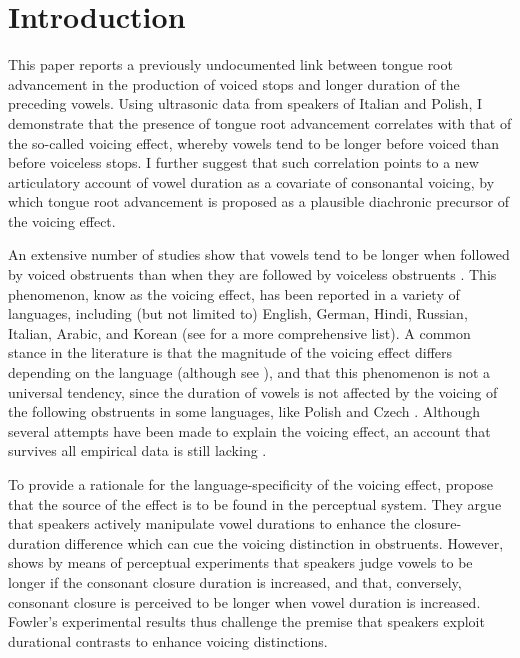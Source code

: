 \documentclass[authoryear, 5p]{elsarticle}
\begin{document}
\section{Introduction}\label{introduction}

\label{s:intro}

This paper reports a previously undocumented link between tongue root
advancement in the production of voiced stops and longer duration of the
preceding vowels. Using ultrasonic data from speakers of Italian and
Polish, I demonstrate that the presence of tongue root advancement
correlates with that of the so-called voicing effect, whereby vowels
tend to be longer before voiced than before voiceless stops. I further
suggest that such correlation points to a new articulatory account of
vowel duration as a covariate of consonantal voicing, by which tongue
root advancement is proposed as a plausible diachronic precursor of the
voicing effect.

An extensive number of studies show that vowels tend to be longer when
followed by voiced obstruents than when they are followed by voiceless
obstruents
\citep{house1953, peterson1960, chen1970, klatt1973, lisker1974, farnetani1986, fowler1992, hussein1994, esposito2002, lampp2004, durvasula2012}.
This phenomenon, know as the voicing effect, has been reported in a
variety of languages, including (but not limited to) English, German,
Hindi, Russian, Italian, Arabic, and Korean (see \citealt{maddieson1976}
for a more comprehensive list). A common stance in the literature is
that the magnitude of the voicing effect differs depending on the
language (although see \citealt{laeufer1992}), and that this phenomenon
is not a universal tendency, since the duration of vowels is not
affected by the voicing of the following obstruents in some languages,
like Polish and Czech \citep{keating1984}. Although several attempts
have been made to explain the voicing effect, an account that survives
all empirical data is still lacking \citep{durvasula2012}.

To provide a rationale for the language-specificity of the voicing
effect, \citet{kluender1988} propose that the source of the effect is to
be found in the perceptual system. They argue that speakers actively
manipulate vowel durations to enhance the closure-duration difference
which can cue the voicing distinction in obstruents. However,
\citet{fowler1992} shows by means of perceptual experiments that
speakers judge vowels to be longer if the consonant closure duration is
increased, and that, conversely, consonant closure is perceived to be
longer when vowel duration is increased. Fowler's experimental results
thus challenge the premise that speakers exploit durational contrasts to
enhance voicing distinctions.
\end{document}
